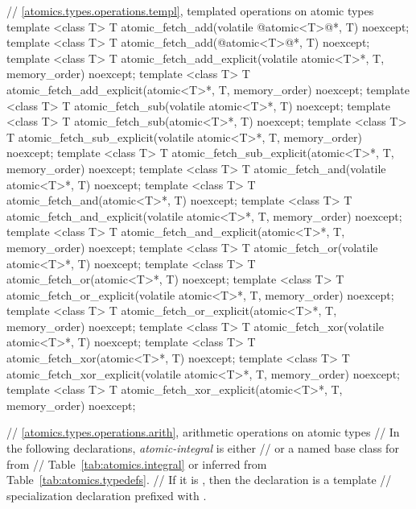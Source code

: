 \begin{codeblock}
{  // \ref{atomics.types.operations.templ}, templated operations on atomic types
  template <class T>
    T atomic_fetch_add(volatile @atomic<T>@*, T) noexcept;
  template <class T>
    T atomic_fetch_add(@atomic<T>@*, T) noexcept;
  template <class T>
    T atomic_fetch_add_explicit(volatile atomic<T>*, T, memory_order) noexcept;
  template <class T>
    T atomic_fetch_add_explicit(atomic<T>*, T, memory_order) noexcept;
  template <class T>
    T atomic_fetch_sub(volatile atomic<T>*, T) noexcept;
  template <class T>
    T atomic_fetch_sub(atomic<T>*, T) noexcept;
  template <class T>
    T atomic_fetch_sub_explicit(volatile atomic<T>*, T, memory_order) noexcept;
  template <class T>
    T atomic_fetch_sub_explicit(atomic<T>*, T, memory_order) noexcept;
  template <class T>
    T atomic_fetch_and(volatile atomic<T>*, T) noexcept;
  template <class T>
    T atomic_fetch_and(atomic<T>*, T) noexcept;
  template <class T>
    T atomic_fetch_and_explicit(volatile atomic<T>*, T, memory_order) noexcept;
  template <class T>
    T atomic_fetch_and_explicit(atomic<T>*, T, memory_order) noexcept;
  template <class T>
    T atomic_fetch_or(volatile atomic<T>*, T) noexcept;
  template <class T>
    T atomic_fetch_or(atomic<T>*, T) noexcept;
  template <class T>
    T atomic_fetch_or_explicit(volatile atomic<T>*, T, memory_order) noexcept;
  template <class T>
    T atomic_fetch_or_explicit(atomic<T>*, T, memory_order) noexcept;
  template <class T>
    T atomic_fetch_xor(volatile atomic<T>*, T) noexcept;
  template <class T>
    T atomic_fetch_xor(atomic<T>*, T) noexcept;
  template <class T>
    T atomic_fetch_xor_explicit(volatile atomic<T>*, T, memory_order) noexcept;
  template <class T>
    T atomic_fetch_xor_explicit(atomic<T>*, T, memory_order) noexcept;

  // \ref{atomics.types.operations.arith}, arithmetic operations on atomic types
  // In the following declarations, \textit{atomic-integral} is either
  //  or a named base class for  from
  // Table~\ref{tab:atomics.integral} or inferred from Table~\ref{tab:atomics.typedefs}.
  // If it is , then the declaration is a template
  // specialization declaration prefixed with .

}
\end{codeblock}
